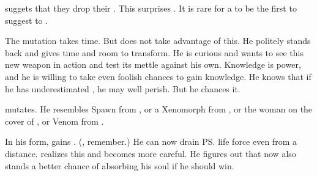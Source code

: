 \begin{garbage}
\Teshrial{} suggets that they drop their . 
This surprises \Ishnaruchaefir{}. 
It is rare for a \resphan{} to be the first to suggest to . 

The mutation takes time. 
But \Ishnaruchaefir{} does not take advantage of this. 
He politely stands back and gives \Teshrial{} time and room to transform. 
He is curious and wants to see this new weapon in action and test its mettle against his own. 
Knowledge is power, and he is willing to take even foolish chances to gain knowledge. 
He knows that if he has underestimated \Teshrial, he may well perish. 
But he chances it. 

\Teshrial{} mutates. 
He resembles Spawn from \cite{ToddMcFarlane:Spawn}, or a Xenomorph from \cite{Movie:Alien}, or the woman on the cover of \cite{HourofPenance:TheVileConception}, or Venom from \cite{StanLeeSteveDitko:SpiderMan}. 



In his \neoresphan{} form, \Teshrial{} gains . 
(, remember.) 
He can now drain \ps{\Ishnaruchaefir} life force even from a distance. 
\Ishnaruchaefir{} realizes this and becomes more careful. 
He figures out that \Teshrial{} now also stands a better chance of absorbing his soul if he should win. 


\end{garbage}

